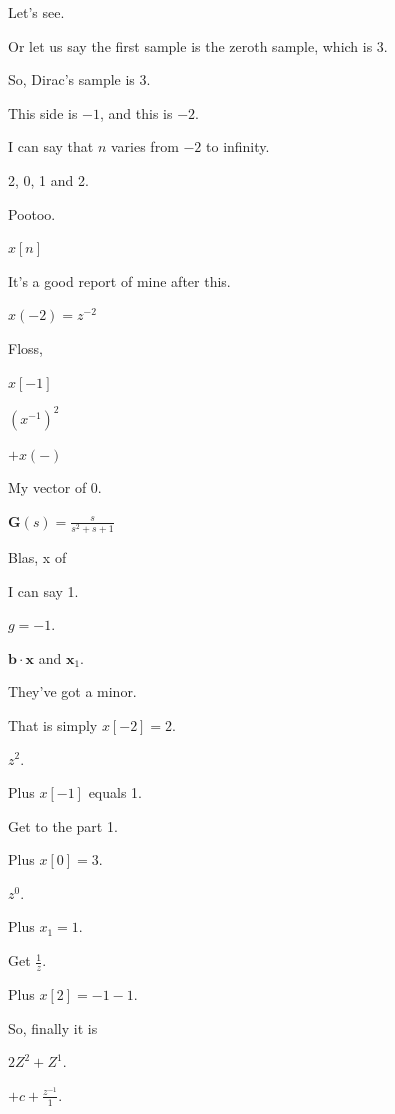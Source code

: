 \documentclass{article}
\begin{document}
Let's see.

Or let us say the first sample is the zeroth sample, which is 3.

So, Dirac's sample is 3.

This side is $-1$, and this is $-2$.

I can say that $n$ varies from $-2$ to infinity.

2, 0, 1 and 2.

Pootoo.

$x[n]$

It's a good report of mine after this.

$x(-2) = z^{-2}$

Floss,

$x[-1]$

$(x^{-1})^2$

$+ x(-)$

My vector of 0.

$\mathbf{G}(s) = \frac{s}{s^2 + s + 1}$

Blas, x of

I can say 1.

$g = -1.$

$\mathbf{b} \cdot \mathbf{x}$ and $\mathbf{x}_1$.

They've got a minor.

That is simply $x[-2] = 2$.

$z^2$.

Plus $x[-1]$ equals 1.

Get to the part 1.

Plus $x[0] = 3$.

$z^0$.

Plus $x_1 = 1$.

Get $\frac{1}{z}$.

Plus $x[2] = -1 - 1$.

So, finally it is

$2Z^2 + Z^1$.

$+c + \frac{z^{-1}}{1}$.
\end{document}
